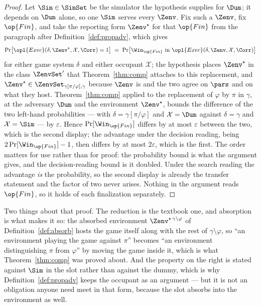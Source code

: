\documentclass[10pt,oneside,openany]{book}
\theoremstyle{accentdef}
\theoremstyle{accentplain}
\begin{document}
\begin{proof}
Let $\Sim \in \SimSet$ be the simulator the hypothesis supplies for $\Dum$; it depends on $\Dum$
alone, so one $\Sim$ serves every $\Zenv$. Fix such a $\Zenv$, fix $\op{Fin}$, and take the
reporting form
$\Zenv^{\star}$ for that $\op{Fin}$ from the paragraph after Definition~\ref{def:propadv}, which gives
\[
  \Pr\bigl[\opl{Exec}(\delta,\Zenv^{\star},\mathcal{X},\Corr) = 1\bigr]
  \;=\;
  \Pr\bigl[\Win_{\op{Fin}} \ \text{in} \ \opl{Exec}(\delta,\Zenv,\mathcal{X},\Corr)\bigr]
\]
for either game system $\delta$ and either occupant $\mathcal{X}$; the hypothesis places
$\Zenv^{\star}$ in the class $\ZenvSet'$ that Theorem~\ref{thm:comp} attaches to this replacement, and
$\Zenv^{\star} \in \ZenvSet_{\gamma[\pi/\varphi],\gamma}$ because $\Zenv$ is and the two agree on
$\pars$ and on what they host. Theorem~\ref{thm:comp} applied to
the replacement of $\varphi$ by $\pi$ in $\gamma$, at the adversary $\Dum$ and the environment
$\Zenv^{\star}$, bounds the difference of the two left-hand probabilities --- with
$\delta = \gamma[\pi/\varphi]$ and $\mathcal{X} = \Dum$ against $\delta = \gamma$ and
$\mathcal{X} = \Sim$ --- by $\varepsilon$. Hence $\Pr[\Win_{\op{Fin}}]$ differs by at most
$\varepsilon$ between
the two, which is the second display; the advantage under the decision reading, being
$2\Pr[\Win_{\op{Fin}}]-1$, then differs by at most $2\varepsilon$, which is the first. The order
matters for use
rather than for proof: the probability bound is what the argument gives, and the decision-reading
bound is it doubled. Under the search reading the advantage \emph{is} the probability, so the
second display is already the transfer statement and the factor of two never arises. Nothing in the
argument reads $\op{Fin}$, so it holds of each finalization separately.
\end{proof}

Two things about that proof. The reduction is the textbook one, and absorption is what makes it so: the
absorbed environment $\Zenv^{\star\,\gamma \setminus \varphi}$ of Definition~\ref{def:absorb} hosts
the game itself along with the rest of $\gamma \setminus \varphi$, so ``an environment playing the game
against $\pi$'' becomes ``an environment distinguishing $\pi$ from $\varphi$'' by moving the game
inside it, which is what Theorem~\ref{thm:comp} was proved about. And the property on the right is
stated against $\Sim$ in the slot rather than against the dummy, which is why
Definition~\ref{def:propadv} keeps the occupant as an argument --- but it is not an obligation anyone
need meet in that form, because the slot absorbs into the environment as well.
\end{document}
